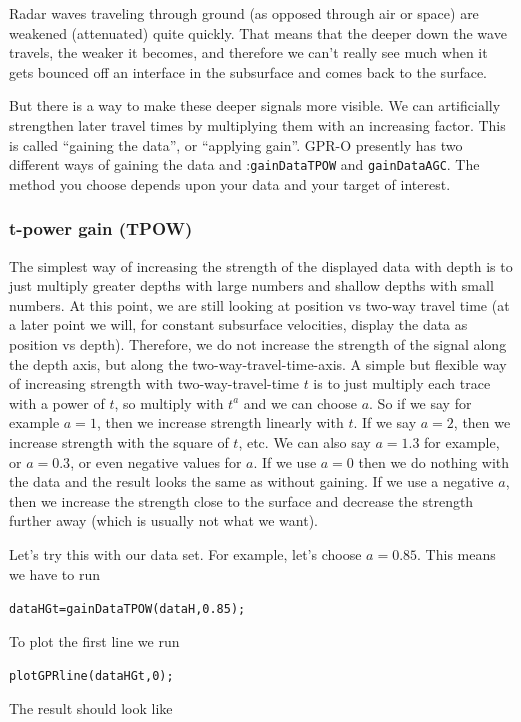 \documentclass[11pt]{article}
\begin{document}
Radar waves traveling through ground (as opposed
through air or space) are weakened (attenuated) quite
quickly. That means that the deeper down the wave travels, the weaker it
becomes, and therefore we can't really see much when it gets bounced off an
interface in the subsurface and comes back to the surface.
 
But there is a way to make these deeper signals more visible. We can
artificially strengthen later travel times by multiplying them with an
increasing factor. This is called ``gaining the data'', or ``applying
gain''. GPR-O presently has two different ways of gaining the data and
:\verb#gainDataTPOW# and \verb#gainDataAGC#. The method you choose depends
upon your data and your target of interest.


\subsubsection{t-power gain (TPOW)}

The simplest way of increasing the strength of the displayed data with
depth is to just multiply greater depths with large numbers and
shallow depths with small numbers. At this point, we are still looking
at position vs two-way travel time (at a later point we will, for
constant subsurface velocities, display the data as position vs
depth). Therefore, we do not increase the strength of the signal along
the depth axis, but along the two-way-travel-time-axis. A simple but
flexible way of increasing strength with two-way-travel-time $t$ is to
just multiply each trace with a power of $t$, so multiply with $t^a$
and we can choose $a$. So if we say for example $a=1$, then we
increase strength linearly with $t$. If we say $a=2$, then we increase
strength with the square of $t$, etc. We can also say $a=1.3$ for
example, or $a=0.3$, or even negative values for $a$. If we use $a=0$
then we do nothing with the data and the result looks the same as
without gaining. If we use a negative $a$, then we increase the strength
close to the surface and decrease the strength further away (which is
usually not what we want).

Let's try this with our data set. For example, let's choose
$a=0.85$. This means we have to run

\qquad \verb#dataHGt=gainDataTPOW(dataH,0.85);#

To plot the first line we run

\qquad \verb#plotGPRline(dataHGt,0);#

The result should look like
\end{document}
